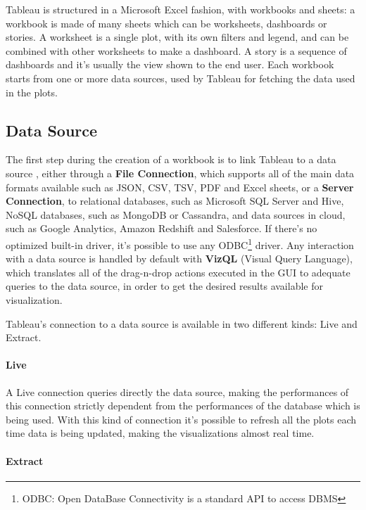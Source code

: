 Tableau is structured in a Microsoft Excel fashion, with workbooks and sheets: a workbook is made of many sheets which can be worksheets, dashboards or stories. A worksheet is a single plot, with its own filters and legend, and can be combined with other worksheets to make a dashboard. A story is a sequence of dashboards and it's usually the view shown to the end user. Each workbook starts from one or more data sources, used by Tableau for fetching the data used in the plots.

\subsection{Data Source}

The first step during the creation of a workbook is to link Tableau to a data source \cite{data_tableau}, either through a \textbf{File Connection}, which supports all of the main data formats available such as JSON, CSV, TSV, PDF and Excel sheets, or a \textbf{Server Connection}, to relational databases, such as Microsoft SQL Server and Hive, NoSQL databases, such as MongoDB or Cassandra, and data sources in cloud, such as Google Analytics, Amazon Redshift and Salesforce. If there's no optimized built-in driver, it's possible to use any ODBC\footnote{ODBC: Open DataBase Connectivity is a standard API to access DBMS} driver. Any interaction with a data source is handled by default with \textbf{VizQL} (Visual Query Language), which translates all of the drag-n-drop actions executed in the GUI to adequate queries to the data source, in order to get the desired results available for visualization.

Tableau's connection to a data source is available in two different kinds: Live and Extract.

\paragraph{Live}

A Live connection queries directly the data source, making the performances of this connection strictly dependent from the performances of the database which is being used. With this kind of connection it's possible to refresh all the plots each time data is being updated, making the visualizations almost real time.

\paragraph{Extract}

